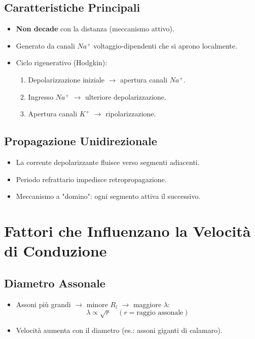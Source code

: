 \documentclass{article}
\begin{document}
\subsection{Caratteristiche Principali}
\begin{itemize}
    \item \textbf{Non decade} con la distanza (meccanismo attivo).
    \item Generato da canali \(Na^+\) voltaggio-dipendenti che si aprono localmente.
    \item Ciclo rigenerativo (Hodgkin):
    \begin{enumerate}
        \item Depolarizzazione iniziale \(\rightarrow\) apertura canali \(Na^+\).
        \item Ingresso \(Na^+\) \(\rightarrow\) ulteriore depolarizzazione.
        \item Apertura canali \(K^+\) \(\rightarrow\) ripolarizzazione.
    \end{enumerate}
\end{itemize}


\subsection{Propagazione Unidirezionale}
\begin{itemize}
    \item La corrente depolarizzante fluisce verso segmenti adiacenti.
    \item Periodo refrattario impedisce retropropagazione.
    \item Meccanismo a "domino": ogni segmento attiva il successivo.
\end{itemize}


\section{Fattori che Influenzano la Velocità di Conduzione}
\subsection{Diametro Assonale}
\begin{itemize}
    \item Assoni più grandi \(\rightarrow\) minore \(R_l\) \(\rightarrow\) maggiore \(\lambda\):
    \[
    \lambda \propto \sqrt{r} \quad (r = \text{raggio assonale})
    \]
    \item Velocità aumenta con il diametro (es.: assoni giganti di calamaro).
\end{itemize}
\end{document}
